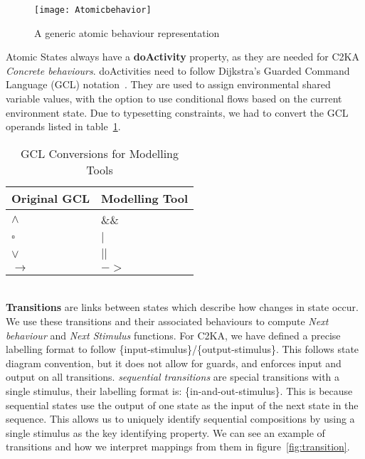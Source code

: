 \begin{figure}[ht]
    \centering
    \texttt{[image: Atomicbehavior]}
    \caption{A generic atomic behaviour representation}
    \label{fig:atomicbehaviour}
\end{figure}

Atomic States always have a \textbf{doActivity} property,
as they are needed for C2KA \textit{Concrete behaviours}.
doActivities need to follow Dijkstra's Guarded Command Language (GCL) notation~\cite{gcl}.
They are used to assign environmental shared variable values,
with the option to use conditional flows based on the current environment state.
Due to typesetting constraints, we had to convert the GCL operands listed in table~\ref{tab:gcl-equivalence}.
\begin{table}[htbp]
      \centering
      \caption{GCL Conversions for Modelling Tools}\label{tab:gcl-equivalence}
      \begin{tabular}{| l | l |}
          \hline
          \textbf{Original GCL} & \textbf{Modelling Tool} \\
          \hline
          $\land$ & \&\& \\ \hline
          $\square$ & $|$ \\ \hline
          $\lor$ & $||$ \\ \hline
          $\rightarrow$ & $->$ \\ \hline
      \end{tabular}
\end{table}
\\

\textbf{Transitions} are links between states which describe how changes in state occur.
We use these transitions and their associated behaviours to compute \textit{Next behaviour} and \textit{Next Stimulus} functions.
For C2KA, we have defined a precise labelling format to follow \{input-stimulus\}/\{output-stimulus\}.
This follows state diagram convention, but it does not allow for guards,
and enforces input and output on all transitions.
\textit{sequential transitions} are special transitions with a single stimulus, their labelling format is: \{in-and-out-stimulus\}.
This is because sequential states use the output of one state as the input of the next state in the sequence.
This allows us to uniquely identify sequential compositions by using a single stimulus as the key identifying property.
We can see an example of transitions and how we interpret mappings from them in figure~\ref{fig:transition}.

